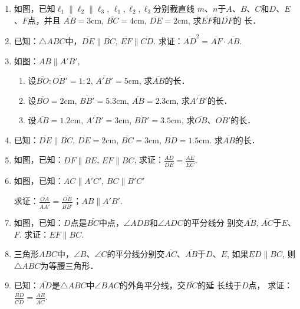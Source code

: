 \begin{ex}
\begin{enumerate}
    \item 如图，已知$\ell_1\parallel \ell_2\parallel \ell_3$, $\ell_1,\ell_2,\ell_3$分别截直线
    $m$、$n$于$A$、$B$、$C$和$D$、$E$、$F$点，并且
    $\overline{AB}=3$cm, $\overline{BC}=4$cm, 
    $\overline{DE}=2$cm, 求$\overline{EF}$和$\overline{DF}$的
    长．

\item 已知：$\triangle ABC$中，$\overline{DE}\parallel \overline{BC}$, $\overline{EF}\parallel \overline{CD}$. 
求证：$\overline{AD}^2=\overline{AF}\cdot \overline{AB}$.

\item 如图：$AB\parallel A'B'$,
\begin{enumerate}
\item 设$\overline{BO}:\overline{OB'}=1:2$, $\overline{A'B'}=5$cm, 求$\overline{AB}$的长．
\item 设$\overline{BO}=2$cm, $\overline{BB'}=5.3$cm, $\overline{AB}=2.3$cm, 求$\overline{A'B'}$的长．
\item 设$\overline{AB}=1.2$cm, $\overline{A'B'}=3$cm, $\overline{BB'}=3.5$cm, 
求$\overline{OB}$、$\overline{OB'}$的长．
\end{enumerate}

\item 已知：$\overline{DE}\parallel \overline{BC}$, $\overline{DE}=2$cm, $\overline{BC}=3$cm, 
$\overline{BD}=1.5$cm. 
求$\overline{AB}$的长．
\item 如图，已知：$DF\parallel BE$, $EF\parallel BC$, 
求证：$\frac{\overline{AD}}{\overline{DE}}=\frac{\overline{AE}}{\overline{EC}}$.

\item 如图，已知：$AC\parallel A'C'$, $BC\parallel B'C'$

求证：$\frac{\overline{OA}}{\overline{AA'}}=\frac{\overline{OB}}{\overline{BB'}}$；$AB\parallel A'B'$.
\item 如图，已知：$D$点是$\overline{BC}$中点，$\angle ADB$和$\angle ADC$的平分线分
别交$\overline{AB}$, $\overline{AC}$于$E$、$F$. 
求证：$EF\parallel BC$.

\item 三角形$ABC$中，$\angle B$、$\angle C$的平分线分别交$\overline{AC}$、$\overline{AB}$于$D$、$E$, 如果$ED\parallel BC$, 则$\triangle ABC$为等腰三角形．
\item 已知：$\overline{AD}$是$\triangle ABC$中$\angle BAC$的外角平分线，交$\overline{BC}$的延
长线于$D$点，
求证：$\frac{\overline{BD}}{\overline{CD}}=\frac{\overline{AB}}{\overline{AC}}$.
\end{enumerate}
\end{ex}
    
